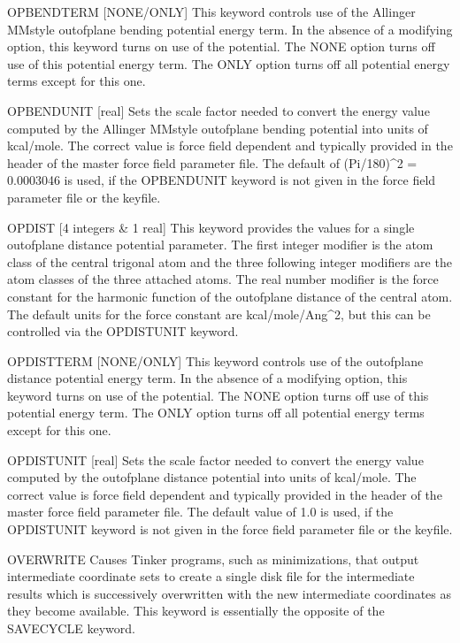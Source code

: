 \documentclass[letterpaper,11pt,english]{sphinxmanual}
\begin{document}
OPBENDTERM {[}NONE/ONLY{]}     This keyword controls use of the Allinger MM\sphinxhyphen{}style out\sphinxhyphen{}of\sphinxhyphen{}plane bending potential energy term. In the absence of a modifying option, this keyword turns on use of the potential. The NONE option turns off use of this potential energy term. The ONLY option turns off all potential energy terms except for this one.

OPBENDUNIT {[}real{]}     Sets the scale factor needed to convert the energy value computed by the Allinger MM\sphinxhyphen{}style out\sphinxhyphen{}of\sphinxhyphen{}plane bending potential into units of kcal/mole. The correct value is force field dependent and typically provided in the header of the master force field parameter file. The default of (Pi/180)\textasciicircum{}2 = 0.0003046 is used, if the OPBENDUNIT keyword is not given in the force field parameter file or the keyfile.

OPDIST {[}4 integers \& 1 real{]}     This keyword provides the values for a single out\sphinxhyphen{}of\sphinxhyphen{}plane distance potential parameter. The first integer modifier is the atom class of the central trigonal atom and the three following integer modifiers are the atom classes of the three attached atoms. The real number modifier is the force constant for the harmonic function of the out\sphinxhyphen{}of\sphinxhyphen{}plane distance of the central atom. The default units for the force constant are kcal/mole/Ang\textasciicircum{}2, but this can be controlled via the OPDISTUNIT keyword.

OPDISTTERM {[}NONE/ONLY{]}     This keyword controls use of the out\sphinxhyphen{}of\sphinxhyphen{}plane distance potential energy term. In the absence of a modifying option, this keyword turns on use of the potential. The NONE option turns off use of this potential energy term. The ONLY option turns off all potential energy terms except for this one.

OPDISTUNIT {[}real{]}     Sets the scale factor needed to convert the energy value computed by the out\sphinxhyphen{}of\sphinxhyphen{}plane distance potential into units of kcal/mole. The correct value is force field dependent and typically provided in the header of the master force field parameter file. The default value of 1.0 is used, if the OPDISTUNIT keyword is not given in the force field parameter file or the keyfile.

OVERWRITE     Causes Tinker programs, such as minimizations, that output intermediate coordinate sets to create a single disk file for the intermediate results which is successively overwritten with the new intermediate coordinates as they become available. This keyword is essentially the opposite of the SAVECYCLE keyword.
\end{document}
